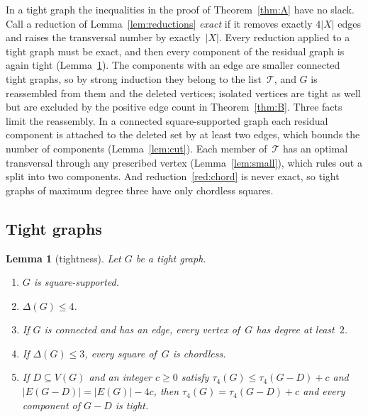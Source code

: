 \documentclass[11pt,letterpaper]{article}
\numberwithin{equation}{section}
\theoremstyle{plain}
\newtheorem{lemma}[theorem]{Lemma}
\theoremstyle{definition}
\theoremstyle{remark}
\newcommand{\Tfam}{\mathcal{T}}
\begin{document}
In a tight graph the inequalities in the proof of Theorem~\ref{thm:A} have no slack. Call a reduction of Lemma~\ref{lem:reductions} \emph{exact} if it removes exactly $4|X|$ edges and raises the transversal number by exactly~$|X|$. Every reduction applied to a tight graph must be exact, and then every component of the residual graph is again tight (Lemma~\ref{lem:tight}). The components with an edge are smaller connected tight graphs, so by strong induction they belong to the list~$\Tfam$, and $G$ is reassembled from them and the deleted vertices; isolated vertices are tight as well but are excluded by the positive edge count in Theorem~\ref{thm:B}. Three facts limit the reassembly. In a connected square-supported graph each residual component is attached to the deleted set by at least two edges, which bounds the number of components (Lemma~\ref{lem:cut}). Each member of~$\Tfam$ has an optimal transversal through any prescribed vertex (Lemma~\ref{lem:small}), which rules out a split into two components. And reduction~\ref{red:chord} is never exact, so tight graphs of maximum degree three have only chordless squares.

\subsection{Tight graphs}

\begin{lemma}[tightness]\label{lem:tight}
Let $G$ be a tight graph.
\begin{enumerate}[label=\textup{(\roman*)}]
\item\label{tight:supp} $G$ is square-supported.
\item\label{tight:max} $\Delta(G)\le4$.
\item\label{tight:min} If $G$ is connected and has an edge, every vertex of~$G$ has degree at least~$2$.
\item\label{tight:chordless} If $\Delta(G)\le3$, every square of~$G$ is chordless.
\item\label{tight:residual} If $D\subseteq V(G)$ and an integer $c\ge0$ satisfy $\tau_4(G)\le\tau_4(G-D)+c$ and $|E(G-D)|=|E(G)|-4c$, then $\tau_4(G)=\tau_4(G-D)+c$ and every component of $G-D$ is tight.
\end{enumerate}
\end{lemma}
\end{document}
